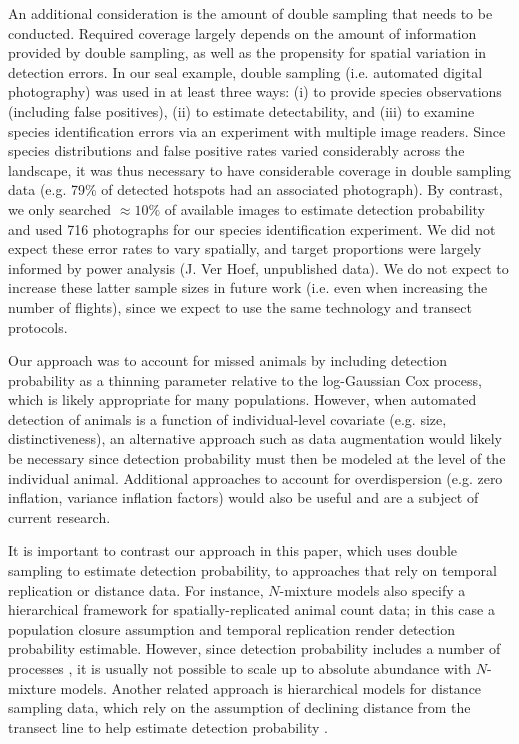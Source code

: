 \documentclass[12pt,fleqn]{article}
\begin{document}
\begin{flushleft}
\hspace{.5in} An additional consideration is the amount of double sampling that needs to be conducted.  Required coverage largely depends on the amount of information provided by double sampling, as well as the propensity for spatial variation in detection errors.  In our seal example, double sampling (i.e. automated digital photography) was used in at least three ways: (i) to provide species observations (including false positives), (ii) to estimate detectability, and (iii) to examine species identification errors via an experiment with multiple image readers. Since species distributions and false positive rates varied considerably across the landscape, it was thus necessary to have considerable coverage in double sampling data (e.g. 79\% of detected hotspots had an associated photograph).  By contrast, we only searched $\approx 10\%$ of available images to estimate detection probability and used 716 photographs for our species identification experiment.  We did not expect these error rates to vary spatially, and target proportions were largely informed by power analysis (J. Ver Hoef, unpublished data).  We do not expect to increase these latter sample sizes in future work (i.e. even when increasing the number of flights), since we expect to use the same technology and transect protocols.

\hspace{.5in} Our approach was to account for missed animals by including detection probability as a thinning parameter relative to the log-Gaussian Cox process, which is likely appropriate for many populations.  However, when automated detection of animals is a function of individual-level covariate (e.g. size, distinctiveness), an alternative approach such as data augmentation \citep{Royle2009,ConnEtAl2012} would likely be necessary since detection probability must then be modeled at the level of the individual animal.  Additional approaches to account for overdispersion (e.g. zero inflation, variance inflation factors) would also be useful and are a subject of current research.

\hspace{.5in} It is important to contrast our approach in this paper, which uses double sampling to estimate detection probability, to approaches that rely on temporal replication or distance data.  For instance, $N$-mixture models \citep{Royle2004} also specify a hierarchical framework for spatially-replicated animal count data; in this case a population closure assumption and temporal replication render detection probability estimable.  However, since detection probability includes a number of processes \citep[e.g. detectability, availability; cf.][]{NicholsEtAl2009}, it is usually not possible to scale up to absolute abundance with $N$-mixture models.  Another related approach is hierarchical models for distance sampling data, which
rely on the assumption of declining distance from the transect line to help estimate detection probability \citep[cf.][]{ConnEtAl2012,SchmidtEtAl2011,VerHoefEtAl2013}.


\end{flushleft}
\end{document}
